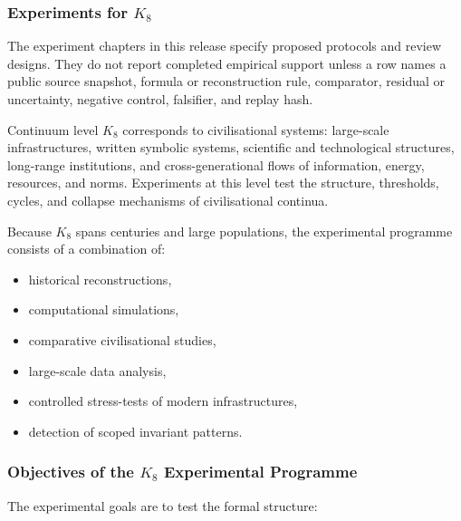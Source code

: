 
\subsubsection{Experiments for \texorpdfstring{$K_8$}{K_8}}

The experiment chapters in this release specify proposed protocols and review designs. They do not report completed empirical support unless a row names a public source snapshot, formula or reconstruction rule, comparator, residual or uncertainty, negative control, falsifier, and replay hash.
\label{sec:experiments-k8}

Continuum level $K_8$ corresponds to civilisational systems:
large-scale infrastructures, written symbolic systems, scientific
and technological structures, long-range institutions, and
cross-generational flows of information, energy, resources, and norms.
Experiments at this level test the structure, thresholds,
cycles, and collapse mechanisms of civilisational continua.

Because $K_8$ spans centuries and large populations, the
experimental programme consists of a combination of:
\begin{itemize}
    \item historical reconstructions,
    \item computational simulations,
    \item comparative civilisational studies,
    \item large-scale data analysis,
    \item controlled stress-tests of modern infrastructures,
    \item detection of scoped invariant patterns.
\end{itemize}



\subsubsection{Objectives of the \texorpdfstring{$K_8$}{K_8} Experimental Programme}

The experimental goals are to test the formal structure:

